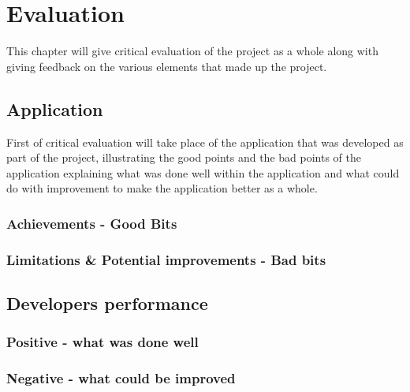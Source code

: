\chapter{Evaluation}

This chapter will give critical evaluation of the project as a whole along with giving feedback on the various elements that made up the project.

\section{Application}

First of critical evaluation will take place of the application that was developed as part of the project, illustrating the good points and the bad points of the application explaining what was done well within the application and what could do with improvement to make the application better as a whole.

\subsection{Achievements - Good Bits}


\subsection{Limitations \& Potential improvements - Bad bits}


\section{Developers performance}

\subsection{Positive - what was done well}


\subsection{Negative - what could be improved}

